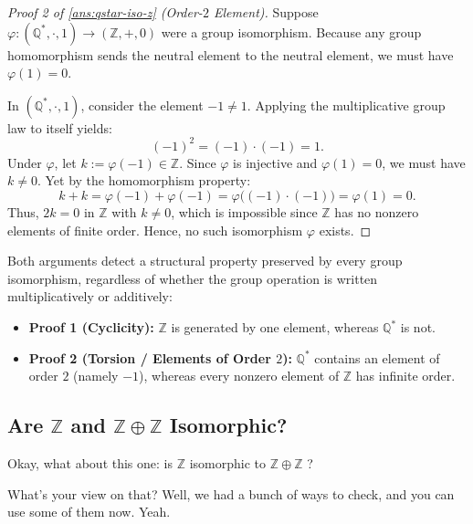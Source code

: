\begin{content}
\begin{proof}[Proof 2 of \cref{ans:qstar-iso-z} (Order-$2$ Element)]
Suppose $\varphi \colon (\mathbb{Q}^*, \cdot, 1) \to (\mathbb{Z}, +, 0)$ were a group isomorphism. Because any group homomorphism sends the neutral element to the neutral element, we must have $\varphi(1) = 0$.

In $(\mathbb{Q}^*, \cdot, 1)$, consider the element $-1 \neq 1$. Applying the multiplicative group law to itself yields:
\[
(-1)^2 = (-1) \cdot (-1) = 1.
\]
Under $\varphi$, let $k := \varphi(-1) \in \mathbb{Z}$. Since $\varphi$ is injective and $\varphi(1) = 0$, we must have $k \neq 0$. Yet by the homomorphism property:
\[
k + k = \varphi(-1) + \varphi(-1) = \varphi\bigl((-1) \cdot (-1)\bigr) = \varphi(1) = 0.
\]
Thus, $2k = 0$ in $\mathbb{Z}$ with $k \neq 0$, which is impossible since $\mathbb{Z}$ has no nonzero elements of finite order. Hence, no such isomorphism $\varphi$ exists.
\end{proof}

\begin{steps}
Both arguments detect a structural property preserved by every group isomorphism, regardless of whether the group operation is written multiplicatively or additively:
\begin{itemize}
    \item \textbf{Proof 1 (Cyclicity):} $\mathbb{Z}$ is generated by one element, whereas $\mathbb{Q}^*$ is not.
    \item \textbf{Proof 2 (Torsion / Elements of Order $2$):} $\mathbb{Q}^*$ contains an element of order $2$ (namely $-1$), whereas every nonzero element of $\mathbb{Z}$ has infinite order.
\end{itemize}
\end{steps}
\end{content}

\subsection{Are \texorpdfstring{$\mathbb{Z}$}{Z} and \texorpdfstring{$\mathbb{Z} \oplus \mathbb{Z}$}{Z + Z} Isomorphic?}

\begin{speech}[00:35:57 - 00:36:19]
Okay, what about this one: is $\mathbb{Z}$ isomorphic to $\mathbb{Z} \oplus \mathbb{Z}$ ?

What's your view on that?  Well, we had a bunch of ways to check, and you can use some of them now. Yeah.
\end{speech}

